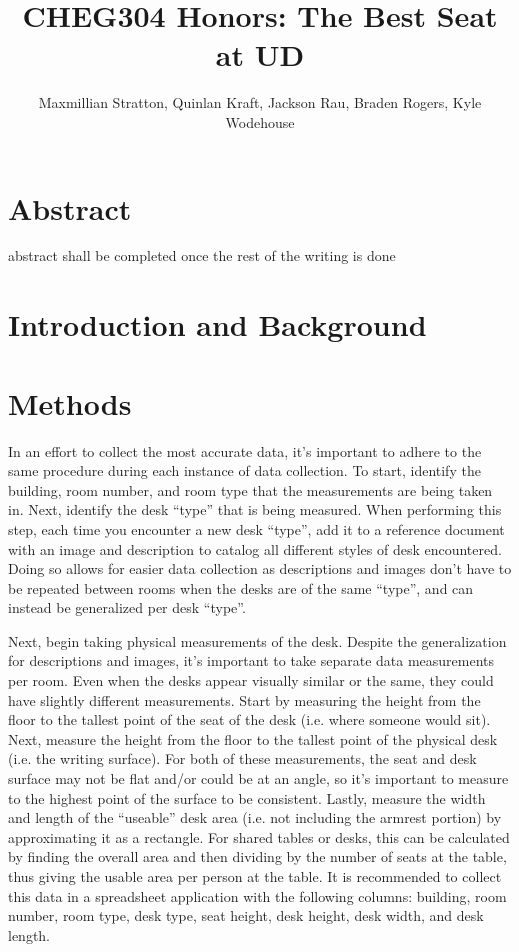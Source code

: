 \documentclass{article}
\title{\bfseries CHEG304 Honors: The Best Seat at UD}
\author{Maxmillian Stratton, Quinlan Kraft, Jackson Rau, Braden Rogers, Kyle Wodehouse}
\date{}
\begin{document}
\maketitle

\section{Abstract}

abstract shall be completed once the rest of the writing is done

\section{Introduction and Background}

\section{Methods}
\indent

In an effort to collect the most accurate data, it’s important to adhere to the same procedure during each instance of data collection. To start, identify the building, room number, and room type that the measurements are being taken in. Next, identify the desk “type” that is being measured. When performing this step, each time you encounter a new desk “type”, add it to a reference document with an image and description to catalog all different styles of desk encountered. Doing so allows for easier data collection as descriptions and images don’t have to be repeated between rooms when the desks are of the same “type”, and can instead be generalized per desk “type”. 

Next, begin taking physical measurements of the desk. Despite the generalization for descriptions and images, it’s important to take separate data measurements per room. Even when the desks appear visually similar or the same, they could have slightly different measurements. Start by measuring the height from the floor to the tallest point of the seat of the desk (i.e. where someone would sit). Next, measure the height from the floor to the tallest point of the physical desk (i.e. the writing surface). For both of these measurements, the seat and desk surface may not be flat and/or could be at an angle, so it’s important to measure to the highest point of the surface to be consistent. Lastly, measure the width and length of the “useable” desk area (i.e. not including the armrest portion) by approximating it as a rectangle. For shared tables or desks, this can be calculated by finding the overall area and then dividing by the number of seats at the table, thus giving the usable area per person at the table. It is recommended to collect this data in a spreadsheet application with the following columns: building, room number, room type, desk type, seat height, desk height, desk width, and desk length.
\end{document}
